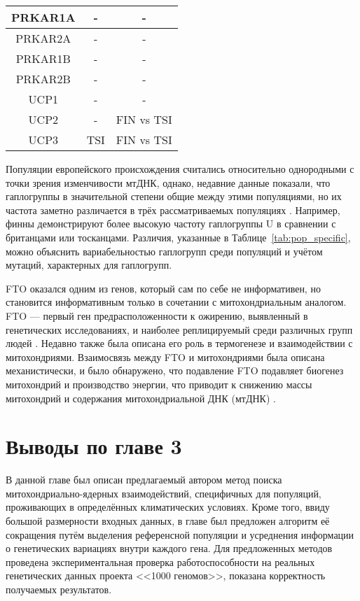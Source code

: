 \begin{table} [htbp]
\begin{threeparttable}
\begin{SingleSpace}
\begin{tabular}{| c | c | c |}
				PRKAR1A       & -                   & -           \\ \hline
				PRKAR2A       & -                   & -           \\ \hline
				PRKAR1B       & -                   & -           \\ \hline
				PRKAR2B       & -                   & -           \\ \hline
				UCP1          & -                   & -           \\ \hline
				UCP2          & -                   & FIN vs TSI  \\ \hline
				UCP3          & TSI                 & FIN vs TSI  \\ \hline
			\end{tabular}%
		\end{SingleSpace}
	\end{threeparttable}
\end{table}

Популяции европейского происхождения считались относительно однородными с точки зрения изменчивости мтДНК, однако, недавние данные показали, что гаплогруппы в значительной степени общие между этими популяциями, но их частота заметно различается в трёх рассматриваемых популяциях \autocite{Pinhasi2012}. Например, финны демонстрируют более высокую частоту гаплогруппы U в сравнении с британцами или тосканцами. Различия, указанные в Таблице~\ref{tab:pop_specific}, можно объяснить вариабельностью гаплогрупп среди популяций и учётом мутаций, характерных для гаплогрупп. 

FTO оказался одним из генов, который сам по себе не информативен, но становится информативным только в сочетании с митохондриальным аналогом. FTO --- первый ген предрасположенности к ожирению, выявленный в генетических исследованиях, и наиболее реплицируемый среди различных групп людей \autocite{Loos2013}. Недавно также была описана его роль в термогенезе и взаимодействии с митохондриями. Взаимосвязь между FTO и митохондриями была описана механистически, и было обнаружено, что подавление FTO подавляет биогенез митохондрий и производство энергии, что приводит к снижению массы митохондрий и содержания митохондриальной ДНК (мтДНК) \autocite{Kang2018}.

\section*{Выводы по главе 3} \label{sec:ch3/conclusion}                       

В данной главе был описан предлагаемый автором метод поиска митохондриально-ядерных взаимодействий, специфичных для популяций, проживающих в определённых климатических условиях. Кроме того, ввиду большой размерности входных данных, в главе был предложен алгоритм её сокращения путём выделения референсной популяции и усреднения информации о генетических вариациях внутри каждого гена. Для предложенных методов проведена экспериментальная проверка работоспособности на реальных генетических данных проекта <<1000 геномов>>, показана корректность получаемых результатов.
